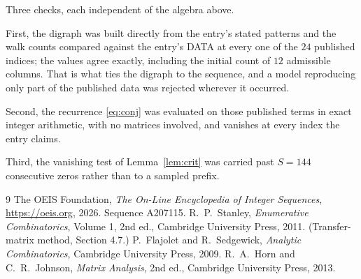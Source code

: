 \documentclass[11pt,a4paper]{article}
\theoremstyle{plain}
\theoremstyle{definition}
\begin{document}
Three checks, each independent of the algebra above.

First, the digraph was built directly from the entry's stated patterns and the walk counts
compared against the entry's DATA at every one of the $24$ published indices; the
values agree exactly, including the initial count of $12$ admissible columns. That is
what ties the digraph to the sequence, and a model reproducing only part of the published
data was rejected wherever it occurred.

Second, the recurrence \eqref{eq:conj} was evaluated on those published terms in exact
integer arithmetic, with no matrices involved, and vanishes at every index the entry claims.

Third, the vanishing test of Lemma~\ref{lem:crit} was carried past $S=144$ consecutive
zeros rather than to a sampled prefix.

\begin{thebibliography}{9}
 The OEIS Foundation, \emph{The On-Line Encyclopedia of Integer
Sequences}, \url{https://oeis.org}, 2026. Sequence A207115.
 R.~P.~Stanley, \emph{Enumerative Combinatorics}, Volume 1, 2nd ed.,
Cambridge University Press, 2011. (Transfer-matrix method, Section 4.7.)
 P.~Flajolet and R.~Sedgewick, \emph{Analytic Combinatorics}, Cambridge
University Press, 2009.
 R.~A.~Horn and C.~R.~Johnson, \emph{Matrix Analysis}, 2nd ed., Cambridge
University Press, 2013.
\end{thebibliography}
\end{document}
